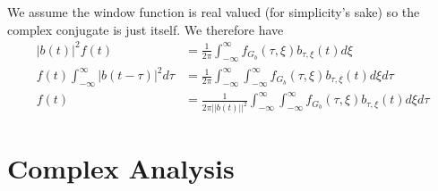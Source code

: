 \documentclass{report}
\theoremstyle{definition}
\theoremstyle{remark}
\begin{document}
We assume the window function is real valued (for simplicity's sake) so the complex conjugate is just itself. We therefore have 
\begin{equation*}
    \begin{split}
        |b(t)|^2f(t) &=\frac{1}{2\pi}\int^\infty_{-\infty}f_{G_b}(\tau, \xi)b_{\tau,\xi}(t)d\xi \\
        f(t)\int^\infty_{-\infty}|b(t-\tau)|^2d\tau &= \frac{1}{2\pi}\int^\infty_{-\infty}\int^\infty_{-\infty}f_{G_b}(\tau, \xi)b_{\tau,\xi}(t)d\xi d\tau \\
        f(t)&= \frac{1}{2\pi ||b(t)||^2}\int^\infty_{-\infty}\int^\infty_{-\infty}f_{G_b}(\tau, \xi)b_{\tau,\xi}(t)d\xi d\tau 
    \end{split}
\end{equation*}



\chapter{Complex Analysis}
\end{document}
